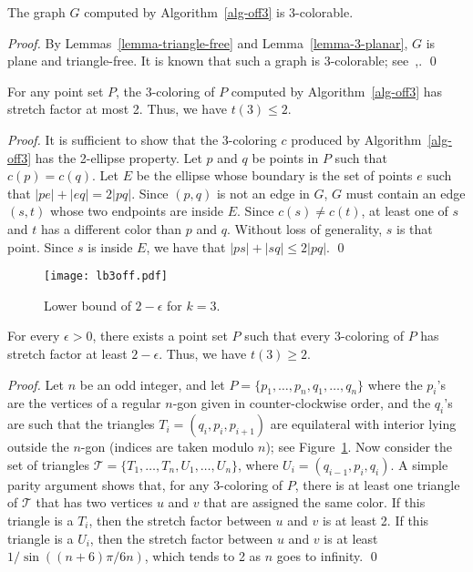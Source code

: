 \documentclass[pdftex,leqno,fleqn,12pts]{llncs}
\begin{document}
\begin{lemma} \label{lemma-3col} 
The graph $G$ computed by Algorithm~\ref{alg-off3} is 3-colorable.
\end{lemma}
\begin{proof}
By Lemmas~\ref{lemma-triangle-free} and Lemma~\ref{lemma-3-planar},
$G$ is plane and triangle-free. It is known that such a graph is
3-colorable; see~\cite{g3color},\cite{thomassen03}.
\qed 
\end{proof}

\begin{lemma}\label{prop-ub3off} 
For any point set $P$, the 3-coloring of $P$ computed by 
Algorithm~\ref{alg-off3} has stretch factor at most 2. Thus, we 
have $t(3)\leq 2$.
\end{lemma}
\begin{proof}
It is sufficient to show that the 3-coloring $c$ produced by
Algorithm~\ref{alg-off3} has the 2-ellipse property. Let $p$ and $q$ be 
points in $P$ such that $c(p)=c(q)$. Let $E$ be the ellipse
whose boundary is the set of points $e$ such that $|pe|+|eq|=2|pq|$.
Since $(p,q)$ is not an edge in $G$, $G$ must contain an edge $(s,t)$
whose two endpoints are inside $E$. Since $c(s)\neq c(t)$, at least
one of $s$ and $t$ has a different color than $p$ and $q$.
Without loss of generality, $s$ is that point. Since $s$ is inside
$E$, we have that $|ps|+|sq|\leq 2|pq|$.
\qed 
\end{proof}

\begin{figure}[h]
\centering\texttt{[image: lb3off.pdf]}\caption{Lower bound of
$2-\epsilon$ for $k=3$.}\label{fig-lb3off}
\end{figure}

\begin{lemma} 
For every $\epsilon>0$, there exists a point set $P$ such that every
$3$-coloring of $P$ has stretch factor at least $2-\epsilon$. 
Thus, we have $t(3)\geq 2$.
\end{lemma}
\begin{proof} 
Let $n$ be an odd integer, and let 
$P=\{p_1,\ldots,p_n,q_1,\ldots,q_n\}$ where the $p_i$'s are the vertices 
of a regular $n$-gon given in counter-clockwise order, and the $q_i$'s 
are such that the triangles $T_i=(q_i,p_i,p_{i+1})$ are equilateral with interior lying outside the $n$-gon
(indices are taken modulo $n$); see Figure~\ref{fig-lb3off}.
Now consider the set of triangles 
$\mathcal{T}=\{T_1,\ldots,T_n,U_1,\ldots,U_n\}$, where
$U_i=(q_{i-1},p_i,q_i)$. A simple parity argument shows
that, for any 3-coloring of $P$, there is at least one triangle of
$\mathcal{T}$ that has two vertices $u$ and $v$ that are assigned
the same color. If this triangle is a $T_i$, then the stretch factor
between $u$ and $v$ is at least 2. If this triangle is a $U_i$, then
the stretch factor between $u$ and $v$ is at least
$ 1/\sin((n+6)\pi/6n)$, which tends to 2 as $n$ goes to infinity.
\qed 
\end{proof}
\end{document}
